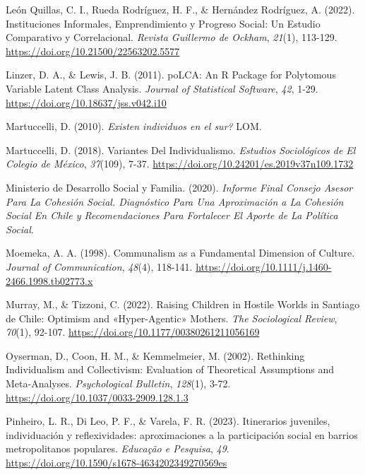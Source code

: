 \documentclass[
  12pt,
  letterpaper,
  DIV=11,
  numbers=noendperiod]{scrartcl}
\newlength{\cslhangindent}
\newenvironment{CSLReferences}[2] %
 {\begin{list}{}{%
  \setlength{\itemindent}{0pt}
  \setlength{\leftmargin}{0pt}
  \setlength{\parsep}{0pt}
  \ifodd #1
   \setlength{\leftmargin}{\cslhangindent}
   \setlength{\itemindent}{-1\cslhangindent}
  \fi
  \setlength{\itemsep}{#2\baselineskip}}}
 {\end{list}}
\begin{document}
\begin{CSLReferences}{1}{0}
León Quillas, C. I., Rueda Rodríguez, H. F., \& Hernández Rodríguez, A.
(2022). Instituciones Informales, Emprendimiento y Progreso Social: Un
Estudio Comparativo y Correlacional. \emph{Revista Guillermo de Ockham},
\emph{21}(1), 113-129. \url{https://doi.org/10.21500/22563202.5577}

Linzer, D. A., \& Lewis, J. B. (2011). {poLCA}: {An R Package} for
{Polytomous Variable Latent Class Analysis}. \emph{Journal of
Statistical Software}, \emph{42}, 1-29.
\url{https://doi.org/10.18637/jss.v042.i10}

Martuccelli, D. (2010). \emph{{{\textquestiondown}Existen individuos en
el sur?}} LOM.

Martuccelli, D. (2018). Variantes Del Individualismo. \emph{Estudios
Sociol{ó}gicos de El Colegio de M{é}xico}, \emph{37}(109), 7-37.
\url{https://doi.org/10.24201/es.2019v37n109.1732}

Ministerio de Desarrollo Social y Familia. (2020). \emph{Informe {Final
Consejo Asesor} Para La {Cohesi{ó}n Social}. {Diagn{ó}stico} Para Una
Aproximaci{ó}n a La Cohesi{ó}n Social En {Chile} y Recomendaciones Para
Fortalecer El Aporte de La Pol{í}tica Social}.

Moemeka, A. A. (1998). Communalism as a {Fundamental Dimension} of
{Culture}. \emph{Journal of Communication}, \emph{48}(4), 118-141.
\url{https://doi.org/10.1111/j.1460-2466.1998.tb02773.x}

Murray, M., \& Tizzoni, C. (2022). Raising Children in Hostile Worlds in
{Santiago} de {Chile}: {Optimism} and {«Hyper-Agentic»} Mothers.
\emph{The Sociological Review}, \emph{70}(1), 92-107.
\url{https://doi.org/10.1177/00380261211056169}

Oyserman, D., Coon, H. M., \& Kemmelmeier, M. (2002). Rethinking
Individualism and Collectivism: {Evaluation} of Theoretical Assumptions
and Meta-Analyses. \emph{Psychological Bulletin}, \emph{128}(1), 3-72.
\url{https://doi.org/10.1037/0033-2909.128.1.3}

Pinheiro, L. R., Di Leo, P. F., \& Varela, F. R. (2023). {Itinerarios
juveniles, individuaci{ó}n y reflexividades: aproximaciones a la
participaci{ó}n social en barrios metropolitanos populares}.
\emph{Educa{ç}{ã}o e Pesquisa}, \emph{49}.
\url{https://doi.org/10.1590/s1678-4634202349270569es}


\end{CSLReferences}
\end{document}
